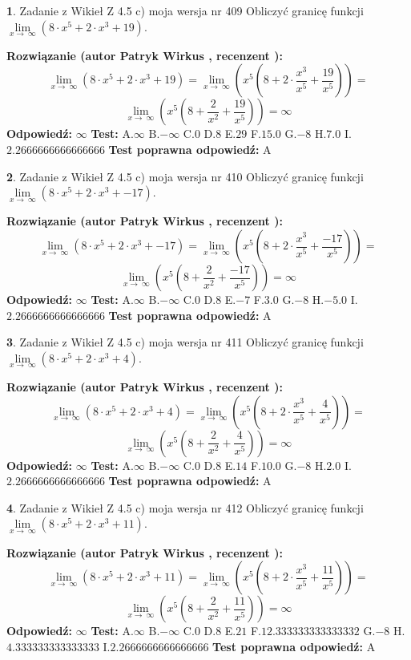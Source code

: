 \documentclass[12pt, a4paper]{article}
\theoremstyle{definition} %
\newtheorem{zad}{}
\newcommand{\zadStart}[1]{\begin{zad}#1\newline}
\newcommand{\zadStop}{\end{zad}}
\newcommand{\rozwStart}[2]{\noindent \textbf{Rozwiązanie (autor #1 , recenzent #2): }\newline}
\newcommand{\rozwStop}{\newline}
\newcommand{\odpStart}{\noindent \textbf{Odpowiedź:}\newline}
\newcommand{\odpStop}{\newline}
\newcommand{\testStart}{\noindent \textbf{Test:}\newline}
\newcommand{\testStop}{\newline}
\newcommand{\kluczStart}{\noindent \textbf{Test poprawna odpowiedź:}\newline}
\newcommand{\kluczStop}{\newline}
\begin{document}
\zadStart{Zadanie z Wikieł Z 4.5 c) moja wersja nr 409}
Obliczyć granicę funkcji  $\lim\limits_{x\to\ \infty}(8 \cdot x^{5}+2 \cdot x^{3}+19)$.
\zadStop
\rozwStart{Patryk Wirkus}{}
$$\lim\limits_{x\to\ \infty}(8 \cdot x^{5}+2 \cdot x^{3}+19) = \lim\limits_{x\to\ \infty}(x^{5}(8 +2 \cdot \frac{x^{3}}{x^{5}}+\frac{19}{x^{5}})) =$$ $$\lim\limits_{x\to\ \infty}(x^{5}(8 +\frac{2}{x^{2}}+\frac{19}{x^{5}})) =\infty$$
\rozwStop
\odpStart
$\infty$
\odpStop
\testStart
A.$\infty$ B.$-\infty$ C.$0$ D.$8$ E.$29$
F.$15.0$ G.$-8$
H.$7.0$
I.$2.2666666666666666$
\testStop
\kluczStart
A
\kluczStop



\zadStart{Zadanie z Wikieł Z 4.5 c) moja wersja nr 410}
Obliczyć granicę funkcji  $\lim\limits_{x\to\ \infty}(8 \cdot x^{5}+2 \cdot x^{3}+-17)$.
\zadStop
\rozwStart{Patryk Wirkus}{}
$$\lim\limits_{x\to\ \infty}(8 \cdot x^{5}+2 \cdot x^{3}+-17) = \lim\limits_{x\to\ \infty}(x^{5}(8 +2 \cdot \frac{x^{3}}{x^{5}}+\frac{-17}{x^{5}})) =$$ $$\lim\limits_{x\to\ \infty}(x^{5}(8 +\frac{2}{x^{2}}+\frac{-17}{x^{5}})) =\infty$$
\rozwStop
\odpStart
$\infty$
\odpStop
\testStart
A.$\infty$ B.$-\infty$ C.$0$ D.$8$ E.$-7$
F.$3.0$ G.$-8$
H.$-5.0$
I.$2.2666666666666666$
\testStop
\kluczStart
A
\kluczStop



\zadStart{Zadanie z Wikieł Z 4.5 c) moja wersja nr 411}
Obliczyć granicę funkcji  $\lim\limits_{x\to\ \infty}(8 \cdot x^{5}+2 \cdot x^{3}+4)$.
\zadStop
\rozwStart{Patryk Wirkus}{}
$$\lim\limits_{x\to\ \infty}(8 \cdot x^{5}+2 \cdot x^{3}+4) = \lim\limits_{x\to\ \infty}(x^{5}(8 +2 \cdot \frac{x^{3}}{x^{5}}+\frac{4}{x^{5}})) =$$ $$\lim\limits_{x\to\ \infty}(x^{5}(8 +\frac{2}{x^{2}}+\frac{4}{x^{5}})) =\infty$$
\rozwStop
\odpStart
$\infty$
\odpStop
\testStart
A.$\infty$ B.$-\infty$ C.$0$ D.$8$ E.$14$
F.$10.0$ G.$-8$
H.$2.0$
I.$2.2666666666666666$
\testStop
\kluczStart
A
\kluczStop



\zadStart{Zadanie z Wikieł Z 4.5 c) moja wersja nr 412}
Obliczyć granicę funkcji  $\lim\limits_{x\to\ \infty}(8 \cdot x^{5}+2 \cdot x^{3}+11)$.
\zadStop
\rozwStart{Patryk Wirkus}{}
$$\lim\limits_{x\to\ \infty}(8 \cdot x^{5}+2 \cdot x^{3}+11) = \lim\limits_{x\to\ \infty}(x^{5}(8 +2 \cdot \frac{x^{3}}{x^{5}}+\frac{11}{x^{5}})) =$$ $$\lim\limits_{x\to\ \infty}(x^{5}(8 +\frac{2}{x^{2}}+\frac{11}{x^{5}})) =\infty$$
\rozwStop
\odpStart
$\infty$
\odpStop
\testStart
A.$\infty$ B.$-\infty$ C.$0$ D.$8$ E.$21$
F.$12.333333333333332$ G.$-8$
H.$4.333333333333333$
I.$2.2666666666666666$
\testStop
\kluczStart
A
\kluczStop
\end{document}

